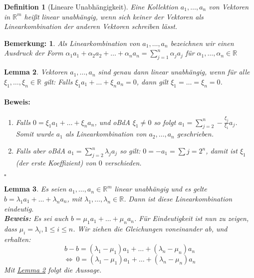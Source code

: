 \documentclass{report}
\newcommand{\IN}[1]{\index{#1|BH}}
\newcommand{\lb}{\lambda}
\newcommand{\R}{\mathbb{R}}
\newcommand{\al}{\alpha}
\theoremstyle{customrem}
\newtheorem*{bem}{Bemerkung:}
\theoremstyle{customdef}
\newtheorem{definition}{Definition}[chapter]
\newtheorem{lem}[definition]{Lemma}
\renewenvironment{proof}{\vspace{-.75cm}\paragraph{Beweis: }}{\vspace{-.5cm}\hfill$\square$}
\begin{document}
	\begin{definition}[Lineare Unabhängigkeit]
		\IN{Lineare!Unabhängigkeit}
		\label{deflineareunab}
		Eine Kollektion $a_1, \dots, a_n$ von Vektoren in $\R^m$ heißt linear unabhängig, wenn sich keiner der Vektoren als Linearkombination der anderen Vektoren schreiben lässt.
	\end{definition}
	
	\begin{bem}
		Als Linearkombination von $a_1, \dots, a_n$ bezeichnen  wir einen Ausdruck der Form $\al_1a_1 + \al_2 a_2 + \ldots + \al_n a_n = \sum_{j=1}^n \al_j a_j$ für $\al_1, \dots, \al_n \in \R$
	\end{bem}

	\begin{lem}
		\label{lem10}
		Vektoren $a_1, \dots, a_n$ sind genau dann linear unabhängig, wenn für alle $\xi_1, \dots, \xi_n \in\R$ gilt: Falls $\xi_1a_1 + \dots + \xi_na_n = 0$, dann gilt $\xi_1 = \dots = \xi_n = 0$.\\
		\begin{proof}
			\begin{enumerate}
				\itemsep-.125cm
				\item Falls $0 = \xi_1 a_1 + \dots + \xi_n a_n$, und oBdA $\xi_1 \neq 0$ so folgt $a_1 = \sum_{j=2}^n -\frac{\xi_j}{\xi_1} a_j$. Somit wurde $a_1$ als Linearkombination von $a_2, \dots, a_n$ geschrieben.
				\item Falls aber oBdA $a_1 = \sum_{j=2}^n \lb_j a_j$ so gilt: $0 = -a_1 = \sum{j=2}^n$, damit ist $\xi_1$ (der erste Koeffizient) von $0$ verschieden.
			\end{enumerate}
		\end{proof}
	\end{lem}
	
	\begin{lem}
		\label{lem11}
		Es seien $a_1, \dots, a_n \in \R^m$  linear unabhängig und es gelte $b = \lb_1a_1 + \dots + \lb_n a_n$, mit $\lb_1, \dots, \lb_n \in \R$. Dann ist diese Linearkombination eindeutig.\\
		\textbf{Beweis:} Es sei auch $b = \mu_1 a_1 + \dots + \mu_n a_n$. Für Eindeutigkeit ist nun zu zeigen, dass $\mu_i = \lb_i, 1 \le i \le n$.
		Wir ziehen die Gleichungen voneinander ab, und erhalten:
		$$
		b - b= (\lb_1 - \mu_1) a_1 + \ldots + (\lb_n - \mu_n) a_n$$$$
		\Leftrightarrow \ 0 = (\lb_1 - \mu_1) a_1 + \ldots + (\lb_n - \mu_n) a_n
		$$
		Mit \hyperref[lem10]{Lemma \ref{lem10}} folgt die Aussage.
	\end{lem}
	
\end{document}
